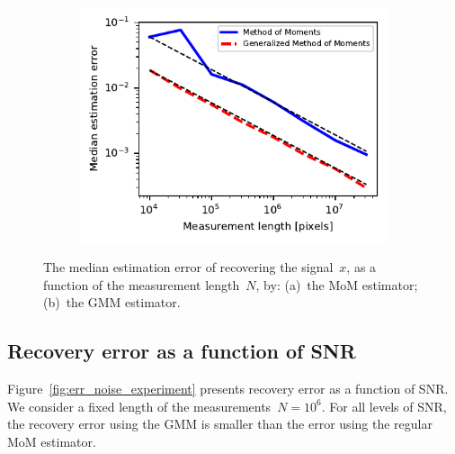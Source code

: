 \documentclass{article}
\begin{document}
\begin{figure}[!tb]
	\begin{subfigure}[ht]{\columnwidth}
		\centering
		\includegraphics[width=\columnwidth]{figures/experiment_size_err.pdf}
	\end{subfigure}
	\caption{The median estimation error of recovering the signal~$x$, as a function of the measurement length~$N$, by: (a)~the MoM estimator; (b)~the GMM estimator.}
\label{fig:err_size_experiment}
\end{figure}

\subsection{Recovery error as a function of SNR}
Figure~\ref{fig:err_noise_experiment} presents recovery error as a function of SNR. We consider a fixed length of the measurements~$N = 10^6$. For all levels of SNR, the recovery error using the GMM is smaller than the error using the regular MoM estimator.
\end{document}

